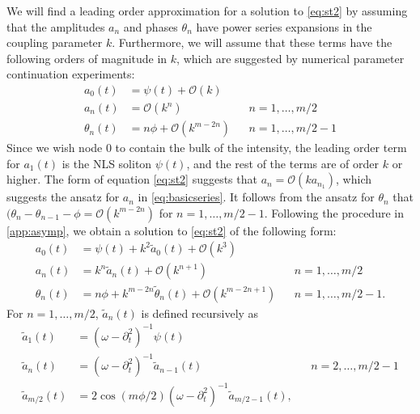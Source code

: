\documentclass[11pt,reqno]{amsart}
\begin{document}
We will find a leading order approximation for a solution to \cref{eq:st2} by assuming that the amplitudes $a_n$ and phases $\theta_n$ have power series expansions in the coupling parameter $k$. Furthermore, we will assume that these terms have the following orders of magnitude in $k$, which are suggested by numerical parameter continuation experiments:
\begin{equation}\label{eq:basicseries}
\begin{aligned}
a_0(t) &= \psi(t) + \mathcal{O}\left(k\right) \\
a_n(t) &= \mathcal{O}\left(k^n\right) && n = 1, \dots, m/2 \\
\theta_n(t) &= n \phi + \mathcal{O}\left(k^{m - 2n}\right) && n = 1, \dots, m/2-1
\end{aligned}
\end{equation}
Since we wish node 0 to contain the bulk of the intensity, the leading order term for $a_1(t)$ is the NLS soliton $\psi(t)$, and the rest of the terms are of order $k$ or higher. The form of equation \cref{eq:st2} suggests that $a_n = \mathcal{O}(k a_{n_1})$, which suggests the ansatz for $a_n$ in \cref{eq:basicseries}. It follows from the ansatz for $\theta_n$ that $(\theta_n - \theta_{n-1} - \phi = \mathcal{O}\left(k^{m - 2n}\right)$ for $n = 1, \dots, m/2-1$. Following the procedure in \cref{app:asymp}, we obtain a solution to \cref{eq:st2} of the following form:
\begin{equation}\label{eq:asympsol}
\begin{aligned}
a_0(t) &= \psi(t) + k^2 \tilde{a}_0(t) + \mathcal{O}(k^3) \\
a_n(t) &= k^n \tilde{a}_n(t) + \mathcal{O}(k^{n+1}) && n = 1, \dots, m/2 \\
\theta_n(t) &= n \phi + k^{m - 2n} \tilde{\theta}_n(t) 
+ \mathcal{O}(k^{m - 2n+1}) && n = 1, \dots, m/2-1.
\end{aligned}
\end{equation}
For $n = 1, \dots, m/2$, $\tilde{a}_n(t)$ is defined recursively as 
\begin{equation}\label{eq:tildean}
\begin{aligned}
\tilde{a}_1(t) &= (\omega - \partial_t^2)^{-1} \psi(t) \\
\tilde{a}_n(t) &= (\omega - \partial_t^2)^{-1} \tilde{a}_{n-1}(t) && n = 2, \dots, m/2-1 \\
\tilde{a}_{m/2}(t) &= 2 \cos( m\phi/2)(\omega - \partial_t^2)^{-1} \tilde{a}_{m/2-1}(t),
\end{aligned}
\end{equation}
\end{document}
